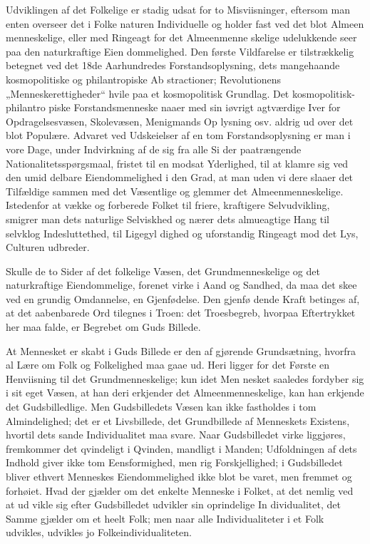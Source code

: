 \documentclass[12pt]{book}
\newcommand{\opage}[1]{\marginnote{\footnotesize\textit{[#1]}}}
\begin{document}
Udviklingen af det Folkelige er stadig udsat for to
Misviisninger, eftersom man enten overseer det i Folke\-%
naturen Individuelle og holder fast ved det blot Almeen\-%
menneskelige, eller med Ringeagt for det Almeenmenne\-%
skelige udelukkende seer paa den naturkraftige Eien\-%
dommelighed. Den første Vildfarelse er tilstrækkelig
betegnet ved det 18de Aarhundredes Forstandsoplysning,
dets mangehaande kosmopolitiske og philantropiske Ab\-%
stractioner; Revolutionens „Menneskerettigheder“ hvile paa
et kosmopolitisk Grundlag. Det kosmopolitisk-philantro\-%
piske Forstandsmenneske naaer med sin iøvrigt agtværdige
Iver for Opdragelsesvæsen, Skolevæsen, Menigmands Op\-%
lysning osv. aldrig ud over det blot Populære. Advaret
ved Udskeielser af en tom Forstandsoplysning er man i
vore Dage, under Indvirkning af de sig fra alle Si\-%
der paatrængende Nationalitetsspørgsmaal, fristet til en
modsat Yderlighed, til at klamre sig ved den umid\-%
delbare Eiendommelighed i den Grad, at man uden vi\-%
dere slaaer det Tilfældige sammen med det Væsentlige
og glemmer det Almeenmenneskelige. Istedenfor at vække
og forberede Folket til friere, kraftigere Selvudvikling,
smigrer man dets naturlige Selviskhed og nærer dets
almueagtige Hang til selvklog Indesluttethed, til Ligegyl\-%
\opage{123}\setcounter{footnote}{0}%
dighed og uforstandig Ringeagt mod det Lys, Culturen
udbreder.

Skulle de to Sider af det folkelige Væsen, det
Grundmenneskelige og det naturkraftige Eiendommelige,
forenet virke i Aand og Sandhed, da maa det skee ved
en grundig Omdannelse, en Gjenfødelse. Den gjenfø\-%
dende Kraft betinges af, at det aabenbarede Ord tilegnes
i Troen: det Troesbegreb, hvorpaa Eftertrykket her
maa falde, er Begrebet om Guds Billede.

At Mennesket er skabt i Guds Billede er den af\-%
gjørende Grundsætning, hvorfra al Lære om Folk og
Folkelighed maa gaae ud. Heri ligger for det Første
en Henviisning til det Grundmenneskelige; kun idet Men\-%
nesket saaledes fordyber sig i sit eget Væsen, at han
deri erkjender det Almeenmenneskelige, kan han erkjende
det Gudsbilledlige. Men Gudsbilledets Væsen kan ikke
fastholdes i tom Almindelighed; det er et Livsbillede,
det Grundbillede af Menneskets Existens, hvortil dets
sande Individualitet maa svare. Naar Gudsbilledet virke\-%
liggjøres, fremkommer det qvindeligt i Qvinden, mandligt
i Manden; Udfoldningen af dets Indhold giver ikke tom
Eensformighed, men rig Forskjellighed; i Gudsbilledet
bliver ethvert Menneskes Eiendommelighed ikke blot be\-%
varet, men fremmet og forhøiet. Hvad der gjælder om
det enkelte Menneske i Folket, at det nemlig ved at ud\-%
vikle sig efter Gudsbilledet udvikler sin oprindelige In\-%
dividualitet, det Samme gjælder om et heelt Folk; men
naar alle Individualiteter i et Folk udvikles, udvikles
jo Folkeindividualiteten.
\end{document}
